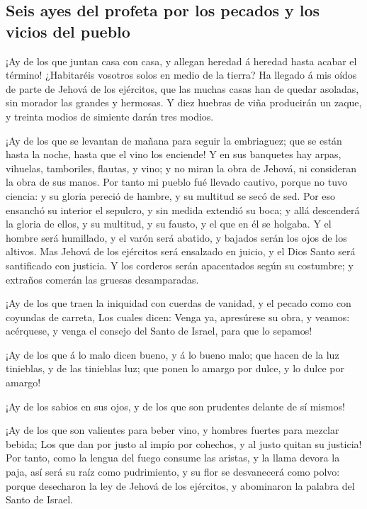 \hypertarget{seis-ayes-del-profeta-por-los-pecados-y-los-vicios-del-pueblo}{%
\subsection{Seis ayes del profeta por los pecados y los vicios del
pueblo}\label{seis-ayes-del-profeta-por-los-pecados-y-los-vicios-del-pueblo}}

 ¡Ay de los que juntan casa con casa, y allegan heredad á
heredad hasta acabar el término! ¿Habitaréis vosotros solos en medio de
la tierra?  Ha llegado á mis oídos de parte de Jehová de los
ejércitos, que las muchas casas han de quedar asoladas, sin morador las
grandes y hermosas.  Y diez huebras de viña producirán un
zaque, y treinta modios de simiente darán tres modios.

 ¡Ay de los que se levantan de mañana para seguir la
embriaguez; que se están hasta la noche, hasta que el vino los enciende!
 Y en sus banquetes hay arpas, vihuelas, tamboriles,
flautas, y vino; y no miran la obra de Jehová, ni consideran la obra de
sus manos.  Por tanto mi pueblo fué llevado cautivo, porque
no tuvo ciencia: y su gloria pereció de hambre, y su multitud se secó de
sed.  Por eso ensanchó su interior el sepulcro, y sin
medida extendió su boca; y allá descenderá la gloria de ellos, y su
multitud, y su fausto, y el que en él se holgaba.  Y el
hombre será humillado, y el varón será abatido, y bajados serán los ojos
de los altivos.  Mas Jehová de los ejércitos será ensalzado
en juicio, y el Dios Santo será santificado con justicia. 
Y los corderos serán apacentados según su costumbre; y extraños comerán
las gruesas desamparadas.

 ¡Ay de los que traen la iniquidad con cuerdas de vanidad,
y el pecado como con coyundas de carreta,  Los cuales
dicen: Venga ya, apresúrese su obra, y veamos: acérquese, y venga el
consejo del Santo de Israel, para que lo sepamos!

 ¡Ay de los que á lo malo dicen bueno, y á lo bueno malo;
que hacen de la luz tinieblas, y de las tinieblas luz; que ponen lo
amargo por dulce, y lo dulce por amargo!

 ¡Ay de los sabios en sus ojos, y de los que son prudentes
delante de sí mismos!

 ¡Ay de los que son valientes para beber vino, y hombres
fuertes para mezclar bebida;  Los que dan por justo al
impío por cohechos, y al justo quitan su justicia!  Por
tanto, como la lengua del fuego consume las aristas, y la llama devora
la paja, así será su raíz como pudrimiento, y su flor se desvanecerá
como polvo: porque desecharon la ley de Jehová de los ejércitos, y
abominaron la palabra del Santo de Israel.


